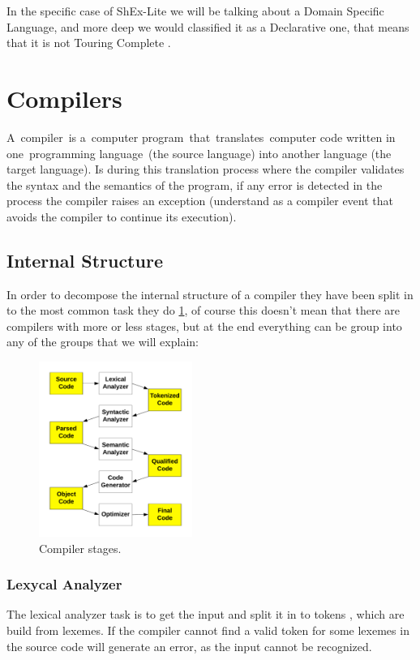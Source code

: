 In the specific case of ShEx-Lite we will be talking about a Domain Specific Language, and more deep we would classified
it as a Declarative one, that means that it is not Touring Complete \cite{touring-complete}.


\section{Compilers}
A compiler is a computer program that translates computer code written in one programming language (the source language)
into another language (the target language). Is during this translation process where the compiler validates the syntax
and the semantics of the program, if any error is detected in the process the compiler raises an exception (understand
as a compiler event that avoids the compiler to continue its execution).

\subsection{Internal Structure}
In order to decompose the internal structure of a compiler they have been split in to the most common task they do
\cref{fig:compiler-stages}, of course this doesn’t mean that there are compilers with more or less stages, but at the
end everything can be group into any of the groups that we will explain:

\begin{figure}
  \includegraphics[width=50mm,scale=0.5]{images/compiler-stages.png}
  \centering
  \caption[Compiler stages]{Compiler stages.}
  \label{fig:compiler-stages}
\end{figure}

\subsubsection{Lexycal Analyzer}
The lexical analyzer task is to get the input and split it in to tokens \cite{lexical-analysis}, which are build
from lexemes. If the compiler cannot find a valid token for some lexemes in the source code will generate an error,
as the input cannot be recognized.

